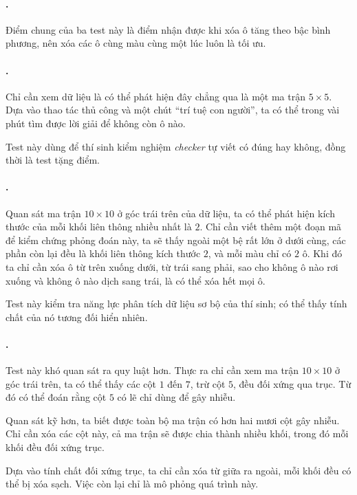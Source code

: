 \documentclass[11pt]{article}
\begin{document}
\paragraph{.}
Điểm chung của ba test này là điểm nhận được khi xóa ô tăng theo bậc bình
phương, nên xóa các ô cùng màu cùng một lúc luôn là tối ưu.

\paragraph{.}
Chỉ cần xem dữ liệu là có thể phát hiện đây chẳng qua là một ma trận
\(5\times5\). Dựa vào thao tác thủ công và một chút ``trí tuệ con người'', ta
có thể trong vài phút tìm được lời giải để không còn ô nào.

Test này dùng để thí sinh kiểm nghiệm \emph{checker} tự viết có đúng hay
không, đồng thời là test tặng điểm.

\paragraph{.}
Quan sát ma trận \(10\times10\) ở góc trái trên của dữ liệu, ta có thể phát
hiện kích thước của mỗi khối liên thông nhiều nhất là \(2\). Chỉ cần viết thêm
một đoạn mã để kiểm chứng phỏng đoán này, ta sẽ thấy ngoài một bệ rất lớn ở
dưới cùng, các phần còn lại đều là khối liên thông kích thước \(2\), và mỗi
màu chỉ có \(2\) ô. Khi đó ta chỉ cần xóa ô từ trên xuống dưới, từ trái sang
phải, sao cho không ô nào rơi xuống và không ô nào dịch sang trái, là có thể
xóa hết mọi ô.

Test này kiểm tra năng lực phân tích dữ liệu sơ bộ của thí sinh; có thể thấy
tính chất của nó tương đối hiển nhiên.

\paragraph{.}
Test này khó quan sát ra quy luật hơn. Thực ra chỉ cần xem ma trận
\(10\times10\) ở góc trái trên, ta có thể thấy các cột \(1\) đến \(7\), trừ
cột \(5\), đều đối xứng qua trục. Từ đó có thể đoán rằng cột \(5\) có lẽ chỉ
dùng để gây nhiễu.

Quan sát kỹ hơn, ta biết được toàn bộ ma trận có hơn hai mươi cột gây nhiễu.
Chỉ cần xóa các cột này, cả ma trận sẽ được chia thành nhiều khối, trong đó
mỗi khối đều đối xứng trục.

Dựa vào tính chất đối xứng trục, ta chỉ cần xóa từ giữa ra ngoài, mỗi khối đều
có thể bị xóa sạch. Việc còn lại chỉ là mô phỏng quá trình này.
\end{document}

